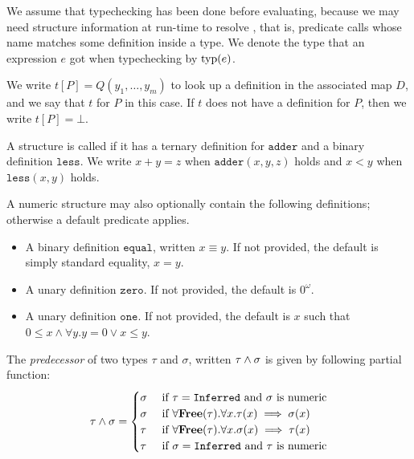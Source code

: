 We assume that typechecking has been done before evaluating, because we may need structure information at run-time to resolve , that is, predicate calls whose name matches some definition inside a type.
We denote the type that an expression $e$ got when typechecking by $\text{typ}{\left( {e} \right)}$.

We write $t[P] = Q(y_1, \ldots, y_m)$ to look up a definition in the associated map $D$, and we say that $t$  for $P$ in this case.
If $t$ does not have a definition for $P$, then we write $t[P] = \bot$.

\begin{definition}
    A structure is called  if it has a ternary definition for $\texttt{adder}$ and a binary definition $\texttt{less}$.
    We write $x + y = z$ when $\texttt{adder}(x, y, z)$ holds and $x < y$ when $\texttt{less}(x, y)$ holds.
    
    A numeric structure may also optionally contain the following definitions; otherwise a default predicate applies.
    
    \begin{itemize}
        \item[] A binary definition $\texttt{equal}$, written $x \equiv y$. 
            If not provided, the default is simply standard equality, $x = y$.
        
        \item[] A unary definition $\texttt{zero}$.
            If not provided, the default is $0^{\omega}$.
            
        \item[] A unary definition $\texttt{one}$.
            If not provided, the default is $x$ such that $0 \leq x \land \forall y. y = 0 \lor x \leq y$.
    \end{itemize}
\end{definition}

\begin{definition}
    The \emph{predecessor} of two types $\tau$ and $\sigma$, written $\tau \wedge \sigma$ is given by following partial function:
    \[
        \tau \wedge \sigma = 
        \begin{cases}
            \sigma & ~\text{if}~ \tau = \texttt{Inferred}~\text{and $\sigma$ is numeric} \\
            \sigma & ~\text{if}~ \forall \textbf{Free}(\tau). \forall x. \tau(x) \implies \sigma(x) \\
            \tau & ~\text{if}~ \forall \textbf{Free}(\tau). \forall x. \sigma(x) \implies \tau(x) \\
            \tau & ~\text{if}~ \sigma = \texttt{Inferred}~\text{and $\tau$ is numeric} \\
        \end{cases}
    \]
\end{definition}

